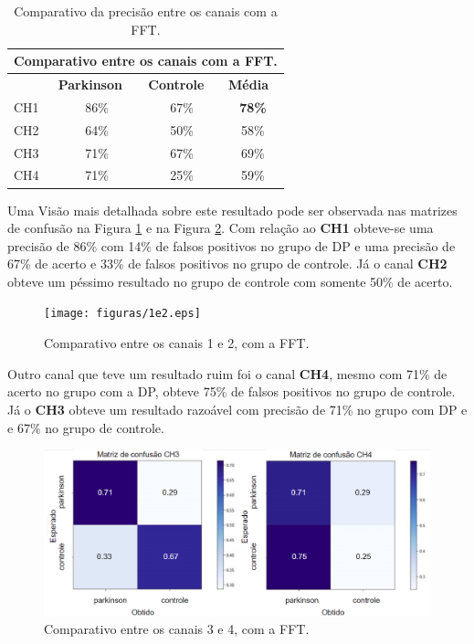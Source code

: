 \begin{table}[]
\centering
\begin{tabular}{lccc}
\hline
\multicolumn{4}{c}{Comparativo entre os canais com a FFT.}                                                                \\ \hline
    & \multicolumn{1}{l}{\textbf{Parkinson}} & \multicolumn{1}{l}{\textbf{Controle}} & \multicolumn{1}{l}{\textbf{Média}} \\
CH1 & 86\%                                   & 67\%                                  & \textbf{78\%}                      \\
CH2 & 64\%                                   & 50\%                                  & 58\%                               \\
CH3 & 71\%                                   & 67\%                                  & 69\%                               \\
CH4 & 71\%                                   & 25\%                                  & 59\%                               \\ \hline
\end{tabular}
\caption{Comparativo da precisão entre os canais com a FFT.}
\label{fcomparativo1}
\end{table}


Uma Visão mais detalhada sobre este resultado pode ser observada nas matrizes de confusão na Figura \ref{fcomparativo2} e na Figura \ref{fcomparativo3}. Com relação ao \textbf{CH1} obteve-se uma precisão de 86\% com 14\% de falsos positivos no grupo de DP e uma precisão de 67\% de acerto e 33\% de falsos positivos no grupo de controle. Já o canal \textbf{CH2} obteve um péssimo resultado no grupo de controle com somente 50\% de acerto. 

\begin{figure}[!t]
    \centering
    \texttt{[image: figuras/1e2.eps]}
    \caption{Comparativo entre os canais 1 e 2, com a FFT.}
    \label{fcomparativo2}
\end{figure}

Outro canal que teve um resultado ruim foi o canal \textbf{CH4}, mesmo com 71\% de acerto no grupo com a DP, obteve 75\% de falsos positivos no grupo de controle. Já o \textbf{CH3} obteve um resultado razoável com precisão de 71\% no grupo com DP e e 67\% no grupo de controle.

\begin{figure}[!t]
    \centering
    \includegraphics[width=1.1\textwidth]{figuras/3e4.eps}
    \caption{Comparativo entre os canais 3 e 4, com a FFT.}
    \label{fcomparativo3}
\end{figure}


